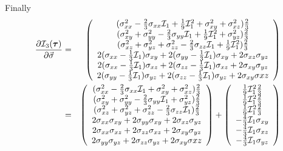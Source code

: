 Finally
\begin{eqnarray}
\frac{\partial {\cal I}_3(\bm\tau)}{\partial \vec\sigma}  
&=& \left(
\begin{array}{c}
(\sigma_{xx}^2 -\frac23 \sigma_{xx} {\cal I}_1 + \frac19{\cal I}_1^2 +  \sigma_{xy}^2 +  \sigma_{xz}^2 ) \frac23 \\
(\sigma_{xy}^2 +  \sigma_{yy}^2 -\frac23 \sigma_{yy} {\cal I}_1 + \frac19{\cal I}_1^2 +  \sigma_{yz}^2 ) \frac23 \\
(\sigma_{xz}^2 +  \sigma_{yz}^2 + \sigma_{zz}^2 -\frac23 \sigma_{zz} {\cal I}_1 + \frac19{\cal I}_1^2 ) \frac23 \\
2(\sigma_{xx}-\frac13{\cal I}_1)\sigma_{xy} +2 (\sigma_{yy}-\frac13{\cal I}_1)\sigma_{xy} + 2 \sigma_{xz}\sigma_{yz} \\
2(\sigma_{xx}-\frac13{\cal I}_1)\sigma_{xz} +2 (\sigma_{zz}-\frac13{\cal I}_1)\sigma_{xz} + 2 \sigma_{xy}\sigma_{yz} \\
2(\sigma_{yy}-\frac13{\cal I}_1)\sigma_{yz} +2 (\sigma_{zz}-\frac13{\cal I}_1)\sigma_{yz} + 2 \sigma_{xy}\sigma{xz} 
\end{array}
\right) \\
&=& \left(
\begin{array}{c}
(\sigma_{xx}^2 -\frac23 \sigma_{xx} {\cal I}_1  +  \sigma_{xy}^2 +  \sigma_{xz}^2 ) \frac23 \\
(\sigma_{xy}^2 +  \sigma_{yy}^2 -\frac23 \sigma_{yy} {\cal I}_1  +  \sigma_{yz}^2 ) \frac23 \\
(\sigma_{xz}^2 +  \sigma_{yz}^2 + \sigma_{zz}^2 -\frac23 \sigma_{zz} {\cal I}_1  ) \frac23 \\
2\sigma_{xx}\sigma_{xy} +2 \sigma_{yy}\sigma_{xy} + 2 \sigma_{xz}\sigma_{yz} \\
2\sigma_{xx}\sigma_{xz} +2 \sigma_{zz}\sigma_{xz} + 2 \sigma_{xy}\sigma_{yz} \\
2\sigma_{yy}\sigma_{yz} +2 \sigma_{zz}\sigma_{yz} + 2 \sigma_{xy}\sigma{xz} 
\end{array}
\right) 
+
\left(
\begin{array}{c}
\frac19{\cal I}_1^2 \frac23\\
\frac19{\cal I}_1^2 \frac23\\
\frac19{\cal I}_1^2 \frac23\\
-\frac43{\cal I}_1 \sigma_{xy} \\
-\frac43{\cal I}_1 \sigma_{xz} \\
-\frac43{\cal I}_1 \sigma_{yz} \\
\end{array}
\right) \nonumber\\

\end{eqnarray}
